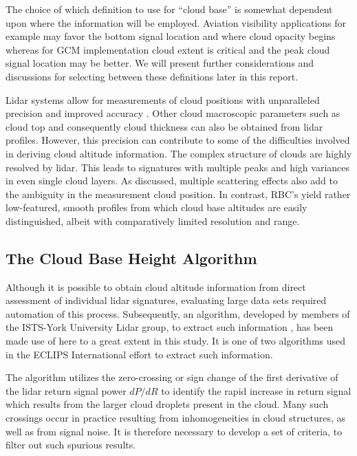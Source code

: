 The choice of which definition to use for ``cloud 
base'' is somewhat dependent upon where the information 
will be employed. Aviation visibility applications 
for example may favor the bottom signal location and where cloud opacity begins
whereas for GCM implementation cloud extent 
is critical and the peak cloud signal location may be better. We will present
further considerations and discussions for selecting between these
definitions later in this report. 

Lidar systems allow for measurements of cloud
positions with unparalleled precision and improved accuracy 
\cite{knl3}\cite{drdlfr}. Other cloud macroscopic
parameters such as cloud top and consequently cloud thickness 
can also be obtained from lidar profiles. However, 
this precision can contribute to some of the difficulties
involved in deriving cloud altitude information.
The complex structure of clouds are 
highly resolved by lidar. This leads to signatures
with multiple peaks and high variances in even single cloud
layers. As discussed, multiple scattering effects
also add to the ambiguity in the measurement cloud position.
In contrast, RBC's yield rather low-featured, smooth
profiles from which cloud base altitudes are easily
distinguished, albeit with comparatively 
limited resolution and range.

\subsection{The Cloud Base Height Algorithm}

Although it is possible to obtain cloud altitude information
from direct assessment of individual lidar signatures,
evaluating large 
data sets required automation
of this process. Subsequently, an algorithm, developed by members 
of the ISTS-York University Lidar group,
to extract such information \cite{srpwsaic}, has been made use
of here to a great extent in this study. 
It is one of two algorithms used in the 
ECLIPS International effort to extract such information. 

The algorithm utilizes the zero-crossing or sign change
of the first derivative of the lidar return signal power $dP/dR$ to
identify the rapid increase in return signal which results from the larger cloud
droplets present in the cloud. 
Many such crossings occur in practice resulting
from inhomogeneities in cloud structures, as well as from signal noise.
It is therefore necessary to develop a set of criteria, to 
filter out such spurious results. 

